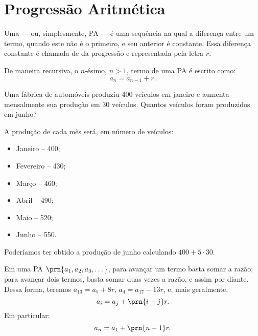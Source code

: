 \section{Progressão Aritmética}

\begin{definition}
Uma  --- ou, simplesmente, PA --- é uma sequência na qual a diferença entre um termo, quando este não é o primeiro, e seu anterior  é constante. Essa diferença constante é chamada de  da progressão e representada pela
letra $r$.
\end{definition}

\begin{remark}
De maneira recursiva, o $n$-ésimo, $n>1$, termo de uma PA é escrito
como:
%
\begin{equation*}
a_n = a_{n-1} + r.
\end{equation*}
\end{remark}

\begin{example}
Uma fábrica de automóveis produziu 400 veículos em janeiro e aumenta mensalmente sua produção em 30 veículos. Quantos veículos foram produzidos em junho?
\end{example}

\begin{solution}
A produção de cada mês será, em número de veículos:
%
\begin{itemize}
	\item Janeiro -- 400;
	\item Fevereiro -- 430;
	\item Março -- 460;
	\item Abril -- 490;
	\item Maio -- 520;
	\item Junho -- 550.
\end{itemize}
%
Poderíamos ter obtido a produção de junho calculando $400 + 5 \cdot 30$.
\end{solution}

\begin{remark}
Em uma PA $\prn{ a_1 , a_2 , a_3 , \dots }$, para avançar um termo basta somar a razão; para avançar dois termos, basta somar duas
vezes a razão, e assim por diante. Dessa forma, teremos $a_{13} = a_5 +8r$, $a_4 = a_{17} - 13r$, e, mais geralmente, 
%
\begin{equation*}
a_i = a_j + \prn{i-j}r.
\end{equation*}
%
Em particular:
%
\begin{equation*}
a_n = a_1 + \prn{n-1}r.
\end{equation*}
\end{remark}

